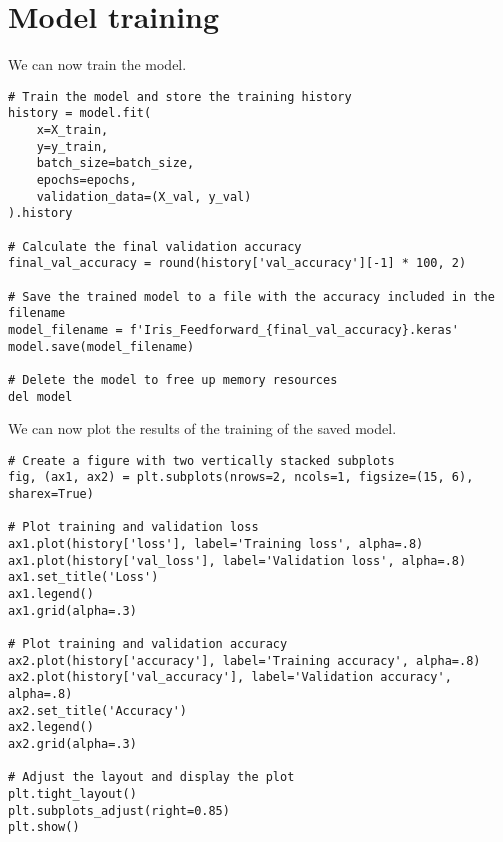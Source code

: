 \section{Model training}

We can now train the model. 
\begin{lstlisting}[style=Python]
# Train the model and store the training history
history = model.fit(
    x=X_train,
    y=y_train,
    batch_size=batch_size,
    epochs=epochs,
    validation_data=(X_val, y_val)
).history

# Calculate the final validation accuracy
final_val_accuracy = round(history['val_accuracy'][-1] * 100, 2)

# Save the trained model to a file with the accuracy included in the filename
model_filename = f'Iris_Feedforward_{final_val_accuracy}.keras'
model.save(model_filename)

# Delete the model to free up memory resources
del model
\end{lstlisting}
We can now plot the results of the training of the saved model. 
\begin{lstlisting}[style=Python]
# Create a figure with two vertically stacked subplots
fig, (ax1, ax2) = plt.subplots(nrows=2, ncols=1, figsize=(15, 6), sharex=True)

# Plot training and validation loss
ax1.plot(history['loss'], label='Training loss', alpha=.8)
ax1.plot(history['val_loss'], label='Validation loss', alpha=.8)
ax1.set_title('Loss')
ax1.legend()
ax1.grid(alpha=.3)

# Plot training and validation accuracy
ax2.plot(history['accuracy'], label='Training accuracy', alpha=.8)
ax2.plot(history['val_accuracy'], label='Validation accuracy', alpha=.8)
ax2.set_title('Accuracy')
ax2.legend()
ax2.grid(alpha=.3)

# Adjust the layout and display the plot
plt.tight_layout()
plt.subplots_adjust(right=0.85)
plt.show()
\end{lstlisting}